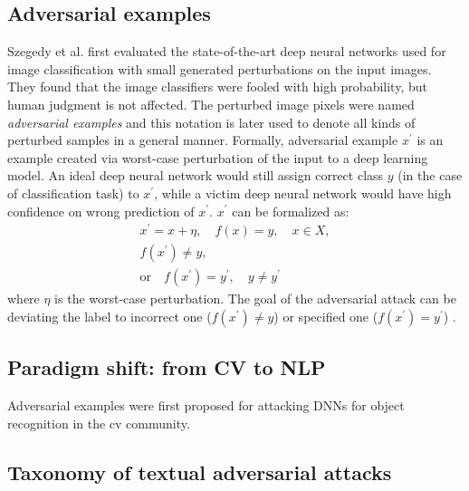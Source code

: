 \subsection{Adversarial examples}\label{subsec:adversarial-attacks}

Szegedy et al. \cite{szegedy2013intriguing} first evaluated the state-of-the-art deep neural networks used for image classification with small generated perturbations on the input images.
They found that the image classifiers were fooled with high probability, but human judgment is not affected. The perturbed image pixels were named \emph{adversarial examples} and this notation is later used to denote all kinds of perturbed samples in a general manner.
Formally, adversarial example $x^\prime$ is an example created via worst-case perturbation of the input to a deep learning model. An ideal deep neural network would still assign correct class $y$ (in the case of classification task) to $x^\prime$, 
while a victim deep neural network would have high confidence on wrong prediction of $x^\prime$. $x^\prime$ can be formalized as:
\begin{equation}
    \begin{array}{l}
    x^\prime = x + \eta, \quad f(x)=y, \quad x \in X,\\
    f(x^\prime) \neq y, \\
    \text{or} \quad f(x^\prime) = y^\prime, \quad y \neq y^\prime
    \end{array}
\end{equation}
where $\eta$ is the worst-case perturbation. The goal of the adversarial attack can be deviating the label to incorrect one ($f(x^\prime) \neq y$) or specified one ($f(x^\prime) = y^\prime$) \cite{journals/tist/ZhangSAL20}.

\subsection[Paradigm shift]{Paradigm shift: from CV to NLP}\label{subsec:paradigm-shift}
Adversarial examples were first proposed for attacking DNNs for object recognition in the \acrfull{cv} community.

\subsection{Taxonomy of textual adversarial attacks}\label{subsec:taxonomy-textual-adversarial-attacks}

